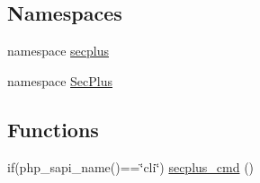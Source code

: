 \subsection*{Namespaces}
\begin{DoxyCompactItemize}
\item 
namespace \hyperlink{namespacesecplus}{secplus}
\item 
namespace \hyperlink{namespace_sec_plus}{SecPlus}
\end{DoxyCompactItemize}
\subsection*{Functions}
\begin{DoxyCompactItemize}
\item 
if(php\_\-sapi\_\-name()==\char`\"{}cli\char`\"{}) \hyperlink{namespace_sec_plus_a7356029118fb0aea3f29fedd5a529938}{secplus\_\-cmd} ()
\end{DoxyCompactItemize}
